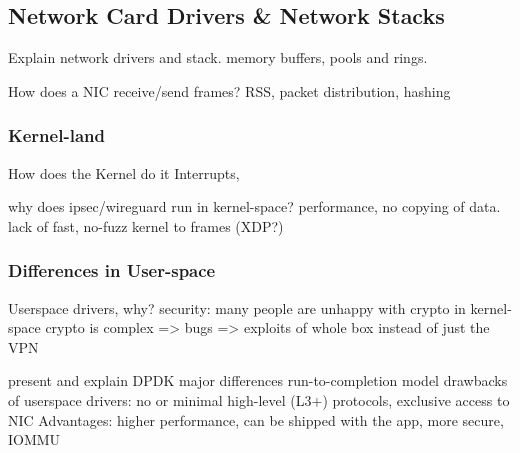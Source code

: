 \subsection{Network Card Drivers \& Network Stacks }
Explain network drivers and stack. memory buffers, pools and rings.

How does a NIC receive/send frames?
RSS, packet distribution, hashing


\subsubsection{Kernel-land}
How does the Kernel do it
Interrupts, 

why does ipsec/wireguard run in kernel-space? performance, no copying of data.
lack of fast, no-fuzz kernel to frames (XDP?)

\subsubsection{Differences in User-space}
Userspace drivers, why?
security: many people are unhappy with crypto in kernel-space
crypto is complex => bugs => exploits of whole box instead of just the VPN

present and explain DPDK
major differences
run-to-completion model
drawbacks of userspace drivers: no or minimal high-level (L3+) protocols, exclusive access to NIC
Advantages: higher performance, can be shipped with the app, more secure, IOMMU



%
